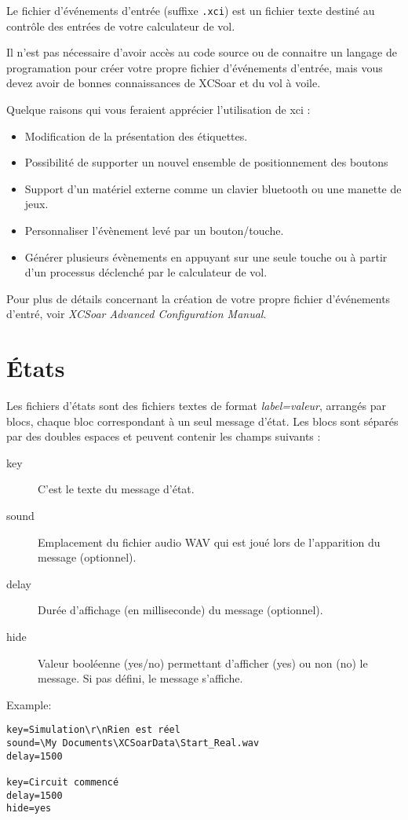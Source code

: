 Le fichier d'événements d'entrée (suffixe  \verb|.xci|) est un fichier texte destiné au contrôle des entrées de votre calculateur de vol.

Il n'est pas nécessaire d'avoir accès au code source ou de connaitre un langage de programation pour créer votre propre fichier d'événements d'entrée, mais vous devez avoir de bonnes connaissances de XCSoar et du vol à voile.


Quelque raisons qui vous feraient apprécier l'utilisation de xci :
\begin{itemize}
\item Modification de la présentation des étiquettes.
\item Possibilité de supporter un nouvel ensemble de positionnement des boutons
\item Support d'un matériel externe comme un clavier bluetooth ou une manette de jeux.
\item Personnaliser l'évènement levé par un bouton/touche.
\item Générer plusieurs évènements en appuyant sur une seule touche ou à partir d'un processus déclenché par le calculateur de vol.
\end{itemize}

Pour plus de détails concernant la création de votre propre fichier d'événements d'entré, voir  {\em XCSoar Advanced Configuration Manual}.

\section{États}\label{sec:status-file}

Les fichiers d'états sont des fichiers textes de format {\em label=valeur}, arrangés par blocs, chaque bloc  correspondant à un seul message d'état. Les blocs sont séparés par des doubles espaces et peuvent contenir les champs suivants :
\begin{description}
\item[key]  C'est le texte du message d'état.
\item[sound] Emplacement du fichier audio WAV qui est joué lors de l'apparition du message (optionnel).
\item[delay] Durée d'affichage (en milliseconde) du message (optionnel).
\item[hide] Valeur booléenne (yes/no) permettant d'afficher (yes) ou non (no) le message. Si pas défini, le message s'affiche.
\end{description} 

Example:
\begin{verbatim}
key=Simulation\r\nRien est réel
sound=\My Documents\XCSoarData\Start_Real.wav
delay=1500

key=Circuit commencé
delay=1500
hide=yes
\end{verbatim}
% 

